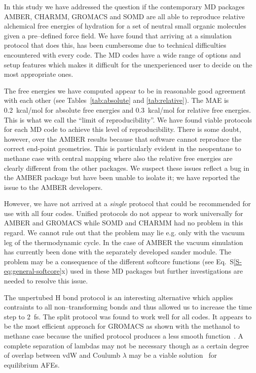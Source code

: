 \documentclass[journal=jctcce,manuscript=article]{achemso}
\begin{document}
In this study we have addressed the question if the contemporary MD packages 
AMBER, CHARMM, GROMACS and SOMD are all able to reproduce relative alchemical 
free energies of hydration for a set of neutral small organic molecules given a 
pre--defined force field.  We have found that arriving at a simulation protocol 
that does this, has been cumbersome due to technical difficulties 
encountered with every code.  The MD codes have a wide range of options and setup features 
which makes it difficult for the unexperienced user to decide on the most 
appropriate ones.

The free energies we have computed appear to be in reasonable good agreement 
with each other (see Tables~\ref{tab:absolute} and \ref{tab:relative}).  The 
MAE is \SI{0.2}{kcal/mol} for absolute free energies and \SI{0.3}{kcal/mol} for 
relative free energies.  This is what we call the ``limit of 
reproducibility''.  We have found viable protocols for each MD code to achieve 
this level of reproducibility.  There is some doubt, however, over the AMBER 
results because that software cannot reproduce the correct end-point 
geometries.  This is particularly evident in the neopentane to methane case 
with central mapping where also the relative free energies are clearly 
different from the other packages.  We suspect these issues reflect a bug in 
the AMBER package but have been unable to isolate it; we have reported the 
issue to the AMBER developers.

However, we have not arrived at a \emph{single} protocol that could be 
recommended for use with all four codes.  Unified protocols do not appear to 
work universally for AMBER and GROMACS while SOMD and CHARMM had no problem 
in this regard.  We cannot rule out that the problem may lie e.g. only with the 
vacuum leg of the thermodynamic cycle.  In the case of AMBER the vacuum 
simulation has currently been done with the separately developed sander module.  
The problem may be a consequence of the different softcore functions 
(see Eq.~S\ref{S-eq:general-softcore}x) used in these MD packages but further investigations are needed to resolve this issue. 

The unpertubed H bond protocol is an interesting alternative which 
applies contraints to all non--transforming bonds and thus allowed us to
increase the time step to \SI{2}{fs}. 
 The split protocol was found to work  well for all codes.
  It appears to be the most efficient 
approach for GROMACS as shown with the methanol to methane case because the 
unified protocol produces a less smooth function~\cite{shirts_chapter_2007}.
A complete separation of lambdas may not be necessary though as a certain 
degree of overlap between vdW and Coulumb $\lambda$ may be a viable 
solution~\cite{procacci_fast_2014} for equilibrium AFEs. %
\end{document}
